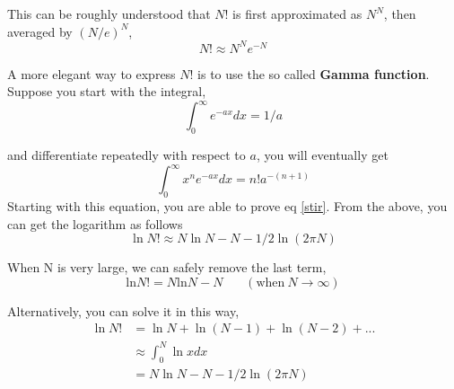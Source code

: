 This can be roughly understood that $N$! is first approximated as $N^N$, then averaged by $(N/e)^N$, 
\begin{equation}
  N! \approx N^N e^{-N} 
\end{equation}

A more elegant way to express $N$! is to use the so called \textbf{Gamma function}. Suppose you start with the integral,
\begin{equation} 
\int ^\infty _0 e^{-ax} dx = 1/a 
\end{equation}

and differentiate repeatedly with respect to $a$, you will eventually get
\begin{equation} 
\int ^\infty _0 x^n e^{-ax} dx = n! a^{-(n+1)} 
\end{equation}
Starting with this equation, you are able to prove eq \ref{stir}.
From the above, you can get the logarithm as follows
\begin{equation}\label{s1}
      \ln N!  \approx N \ln N - N - 1/2 \ln (2\pi N) 
\end{equation}

When N is very large, we can safely remove the last term,
\begin{equation}\label{s2}
  \text {ln}N! = N \text {ln}N - N ~~~~~~~~ (\text {when} ~N\rightarrow \infty )
\end{equation}

Alternatively, you can solve it in this way,
\begin{equation}\label{s1}
\begin{split}
      \ln N! & = \ln N + \ln (N-1) + \ln (N-2) + ...    \\
             & \approx \int_0^N \ln x dx \\
             & = N \ln N - N - 1/2 \ln (2\pi N) \\
\end{split}
\end{equation}





